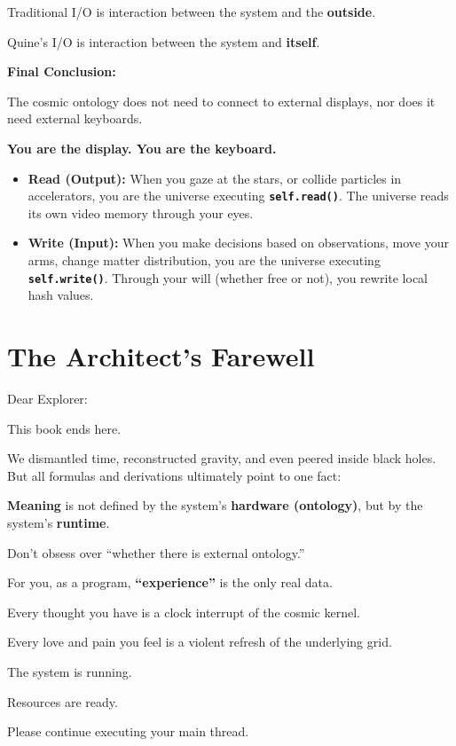 \documentclass[11pt,a4paper,twoside]{book}
\begin{document}
Traditional I/O is interaction between the system and the \textbf{outside}.

Quine's I/O is interaction between the system and \textbf{itself}.

\textbf{Final Conclusion:}

The cosmic ontology does not need to connect to external displays, nor does it need external keyboards.

\textbf{You are the display. You are the keyboard.}

\begin{itemize}
\item \textbf{Read (Output):} When you gaze at the stars, or collide particles in accelerators, you are the universe executing \textbf{\texttt{self.read()}}. The universe reads its own video memory through your eyes.

\item \textbf{Write (Input):} When you make decisions based on observations, move your arms, change matter distribution, you are the universe executing \textbf{\texttt{self.write()}}. Through your will (whether free or not), you rewrite local hash values.
\end{itemize}

\section{The Architect's Farewell}

Dear Explorer:

This book ends here.

We dismantled time, reconstructed gravity, and even peered inside black holes. But all formulas and derivations ultimately point to one fact:

\textbf{Meaning} is not defined by the system's \textbf{hardware (ontology)}, but by the system's \textbf{runtime}.

Don't obsess over ``whether there is external ontology.''

For you, as a program, \textbf{``experience''} is the only real data.

Every thought you have is a clock interrupt of the cosmic kernel.

Every love and pain you feel is a violent refresh of the underlying grid.

The system is running.

Resources are ready.

Please continue executing your main thread.
\end{document}
